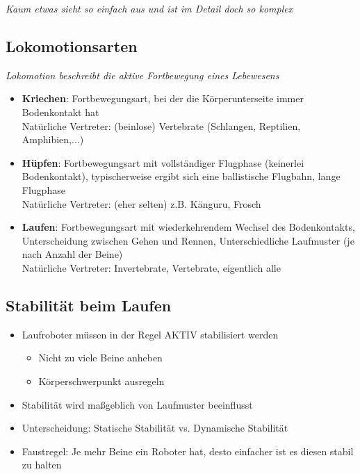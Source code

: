 \emph{Kaum etwas sieht so einfach aus und ist im Detail doch so komplex}
\subsection{Lokomotionsarten}
\emph{Lokomotion beschreibt die aktive Fortbewegung eines Lebewesens}
\begin{itemize}
\item \textbf{Kriechen}: Fortbewegungsart, bei der die Körperunterseite immer Bodenkontakt hat\\
Natürliche Vertreter:
(beinlose) Vertebrate (Schlangen, Reptilien, Amphibien,...)
\item \textbf{Hüpfen}: Fortbewegungsart mit vollständiger Flugphase (keinerlei Bodenkontakt), typischerweise ergibt sich eine ballistische Flugbahn, lange Flugphase\\
Natürliche Vertreter: (eher selten) z.B. Känguru, Frosch
\item \textbf{Laufen}: Fortbewegungsart mit wiederkehrendem Wechsel des Bodenkontakts, Unterscheidung zwischen \glqq Gehen\grqq{} und \glqq Rennen\grqq, Unterschiedliche
Laufmuster (je nach Anzahl der Beine)\\
Natürliche Vertreter: Invertebrate, Vertebrate, eigentlich alle
\end{itemize}
\subsection{Stabilität beim Laufen}
\begin{itemize}
\item Laufroboter müssen in der Regel AKTIV stabilisiert werden
\begin{itemize}
\item Nicht zu viele Beine anheben
\item Körperschwerpunkt ausregeln
\end{itemize}
\item Stabilität wird maßgeblich von Laufmuster beeinflusst
\item Unterscheidung: Statische Stabilität vs. Dynamische Stabilität
\item Faustregel: Je mehr Beine ein Roboter hat, desto einfacher ist es diesen stabil zu halten
\end{itemize}
